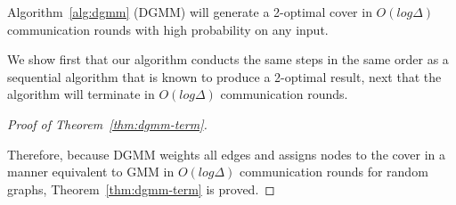 \begin{thm}
  Algorithm~\ref{alg:dgmm} (DGMM) will generate a 2-optimal cover in $O(log \Delta)$ communication rounds with high probability on any input.
\label{thm:dgmm-term}
\end{thm}
\begin{smy}
We show first that our algorithm conducts the same steps in the same order as a sequential algorithm that is known to produce a 2-optimal result, next that the algorithm will terminate in $O(log \Delta)$ communication rounds.
\end{smy} 


\begin{proof}[Proof of Theorem~\ref{thm:dgmm-term}]
\label{prf:correct}




Therefore, because DGMM weights all edges and assigns nodes to the cover in a manner equivalent to GMM in $O(log \Delta)$ communication rounds for random graphs, Theorem~\ref{thm:dgmm-term} is proved.
\end{proof}
